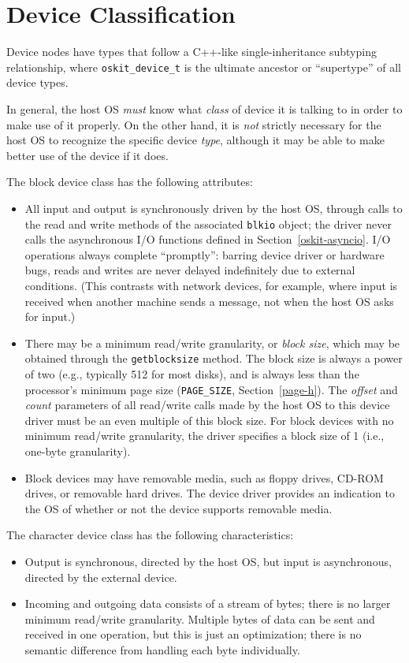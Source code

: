 \section{Device Classification}

Device nodes have types
that follow a C++-like single-inheritance subtyping relationship,
where {\tt oskit_device_t} is the ultimate ancestor or ``supertype''
of all device types.

In general, the host OS \emph{must} know
what \emph{class} of device it is talking to
in order to make use of it properly.
On the other hand, it is \emph{not} strictly necessary
for the host OS to recognize the specific device \emph{type},
although it may be able to make better use of the device if it does.

The block device class has the following attributes:
\begin{itemize}
\item	All input and output is synchronously driven by the host OS,
	through calls to the read and write methods of the associated
	{\tt blkio} object;
	the driver never calls the asynchronous I/O functions
	defined in Section~\ref{oskit-asyncio}.
	I/O operations always complete ``promptly'':
	barring device driver or hardware bugs,
	reads and writes are never delayed indefinitely
	due to external conditions.
	(This contrasts with network devices, for example,
	where input is received when another machine sends a message,
	not when the host OS asks for input.)
\item	There may be a minimum read/write granularity, or \emph{block size},
	which may be obtained through the {\tt getblocksize} method.
	The block size is always a power of two
	(e.g., typically 512 for most disks),
	and is always less than the processor's minimum page size
	({\tt PAGE_SIZE}, Section~\ref{page-h}).
	The \emph{offset} and \emph{count} parameters
	of all read/write calls made by the host OS to this device driver
	must be an even multiple of this block size.
	For block devices with no minimum read/write granularity,
	the driver specifies a block size of 1
	(i.e., one-byte granularity).
\item	Block devices may have removable media,
	such as floppy drives, CD-ROM drives, or removable hard drives.
	The device driver provides an indication to the OS
	of whether or not the device supports removable media.
\end{itemize}

The character device class has the following characteristics:
\begin{itemize}
\item	Output is synchronous, directed by the host OS,
	but input is asynchronous, directed by the external device.
\item	Incoming and outgoing data consists of a stream of bytes;
	there is no larger minimum read/write granularity.
	Multiple bytes of data can be sent and received in one operation,
	but this is just an optimization;
	there is no semantic difference from handling each byte individually.
\end{itemize}

